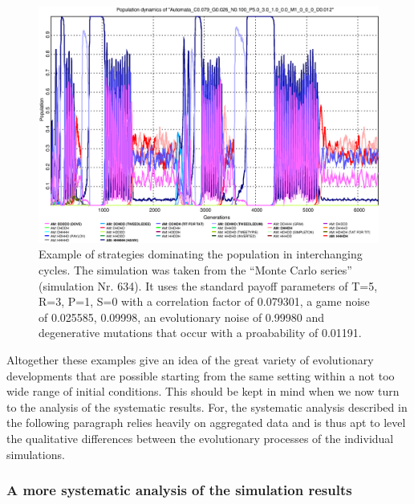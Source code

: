 \begin{figure}
\begin{center}
\includegraphics[width=20cm]{images/SimulationMS634_refined.eps} %
  \caption{\label{SimExample4} Example of strategies dominating the population
    in interchanging cycles. The simulation was taken from the ``Monte Carlo
series'' (simulation Nr. 634). It uses the standard payoff parameters of T=5,
R=3, P=1, S=0 with a correlation factor of 0.079301, a game noise of 0.025585,
0.09998, an evolutionary noise of 0.99980 and degenerative mutations that occur
with a proabability of 0.01191.}
\end{center}
\end{figure}

Altogether these examples give an idea of the great variety of evolutionary
developments that are possible starting from the same setting within a not too
wide range of initial conditions. This should be kept in mind when we now turn
to the analysis of the systematic results. For, the systematic analysis
described in the following paragraph relies heavily on aggregated data and is
thus apt to level the qualitative differences between the evolutionary
processes of the individual simulations.

\subsubsection{A more systematic analysis of the simulation results}

